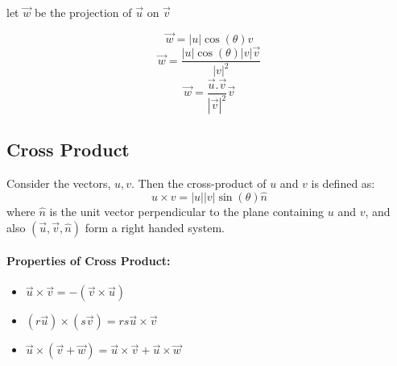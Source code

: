 \documentclass{article}
\begin{document}
let $\vec{w}$ be the projection of $\vec{u}$ on $\vec{v}$

$$\vec{w} = |u| \cos(\theta) \hat{v}$$
$$\vec{w} = \frac{|u| \cos(\theta)|v|\vec{v} }{|v|^2}$$
$$\vec{w} = \frac{\vec{u}.\vec{v}}{|\vec{v}|^2} \vec{v}$$

\subsection*{Cross Product}
Consider the vectors, $u,v$. Then the cross-product of $u$ and $v$ is defined as:
$$u \times v = |u||v|\sin(\theta) \hat{n}$$
where $\hat{n}$ is the unit vector perpendicular to the plane containing $u$ and $v$, and also $(\vec{u}, \vec{v}, \hat{n})$ form a right handed system.

\paragraph*{Properties of Cross Product: }
\begin{itemize}
    \item $\vec{u} \times \vec{v} = - (\vec{v} \times \vec{u})$
    \item $(r\vec{u}) \times (s \vec{v}) = rs \vec{u} \times \vec{v}$
    \item $ \vec{u} \times (\vec{v} + \vec{w}) = \vec{u} \times \vec{v} + \vec{u} \times \vec{w}$
\end{itemize}
\end{document}
